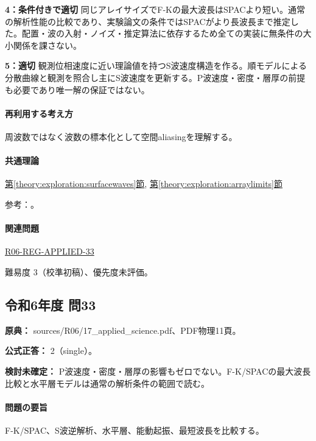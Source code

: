 \noindent\textbf{4：条件付きで適切} 同じアレイサイズでF-Kの最大波長はSPACより短い。通常の解析性能の比較であり、実験論文の条件ではSPACがより長波長まで推定した。配置・波の入射・ノイズ・推定算法に依存するため全ての実装に無条件の大小関係を課さない。\par

\noindent\textbf{5：適切} 観測位相速度に近い理論値を持つS波速度構造を作る。順モデルによる分散曲線と観測を照合し主にS波速度を更新する。P波速度・密度・層厚の前提も必要であり唯一解の保証ではない。\par

\paragraph{再利用する考え方} 周波数ではなく波数の標本化として空間aliasingを理解する。

\paragraph{共通理論} \hyperref[theory:exploration:surfacewaves]{第\ref*{theory:exploration:surfacewaves}節}, \hyperref[theory:exploration:arraylimits]{第\ref*{theory:exploration:arraylimits}節}

\par 参考：\cite{epa_surfacewaves,xia_rayleigh1999,japansea_spac2017,array_limits2002}。

\paragraph{関連問題} \hyperref[q:r06-reg-applied-33]{R06-REG-APPLIED-33}

\par 難易度 3（校準初稿）、優先度未評価。

\subsection{令和6年度 問33}
\label{q:r06-reg-applied-33}

\noindent\textbf{原典：} sources/R06/17\_applied\_science.pdf、PDF物理11頁。

\textbf{公式正答：} 2（single）。

\par\textbf{検討未確定：} P波速度・密度・層厚の影響もゼロでない。F-K/SPACの最大波長比較と水平層モデルは通常の解析条件の範囲で読む。

\paragraph{問題の要旨} F-K/SPAC、S波逆解析、水平層、能動起振、最短波長を比較する。

